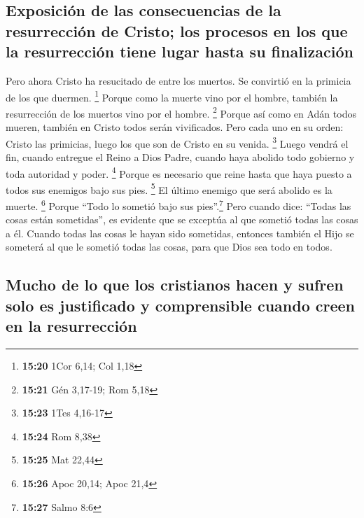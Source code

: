 \hypertarget{exposiciuxf3n-de-las-consecuencias-de-la-resurrecciuxf3n-de-cristo-los-procesos-en-los-que-la-resurrecciuxf3n-tiene-lugar-hasta-su-finalizaciuxf3n}{%
\subsection{Exposición de las consecuencias de la resurrección de
Cristo; los procesos en los que la resurrección tiene lugar hasta su
finalización}\label{exposiciuxf3n-de-las-consecuencias-de-la-resurrecciuxf3n-de-cristo-los-procesos-en-los-que-la-resurrecciuxf3n-tiene-lugar-hasta-su-finalizaciuxf3n}}

 Pero ahora Cristo ha resucitado de entre los muertos. Se
convirtió en la primicia de los que duermen. \footnote{\textbf{15:20}
  1Cor 6,14; Col 1,18}  Porque como la muerte vino por el
hombre, también la resurrección de los muertos vino por el hombre.
\footnote{\textbf{15:21} Gén 3,17-19; Rom 5,18}  Porque
así como en Adán todos mueren, también en Cristo todos serán
vivificados.  Pero cada uno en su orden: Cristo las
primicias, luego los que son de Cristo en su venida. \footnote{\textbf{15:23}
  1Tes 4,16-17}  Luego vendrá el fin, cuando entregue el
Reino a Dios Padre, cuando haya abolido todo gobierno y toda autoridad y
poder. \footnote{\textbf{15:24} Rom 8,38}  Porque es
necesario que reine hasta que haya puesto a todos sus enemigos bajo sus
pies. \footnote{\textbf{15:25} Mat 22,44}  El último
enemigo que será abolido es la muerte. \footnote{\textbf{15:26} Apoc
  20,14; Apoc 21,4}  Porque ``Todo lo sometió bajo sus
pies''.\footnote{\textbf{15:27} Salmo 8:6} Pero cuando dice: ``Todas las
cosas están sometidas'', es evidente que se exceptúa al que sometió
todas las cosas a él.  Cuando todas las cosas le hayan
sido sometidas, entonces también el Hijo se someterá al que le sometió
todas las cosas, para que Dios sea todo en todos.

\hypertarget{mucho-de-lo-que-los-cristianos-hacen-y-sufren-solo-es-justificado-y-comprensible-cuando-creen-en-la-resurrecciuxf3n}{%
\subsection{Mucho de lo que los cristianos hacen y sufren solo es
justificado y comprensible cuando creen en la
resurrección}\label{mucho-de-lo-que-los-cristianos-hacen-y-sufren-solo-es-justificado-y-comprensible-cuando-creen-en-la-resurrecciuxf3n}}

